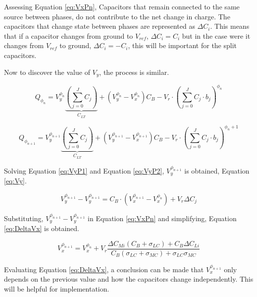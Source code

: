 Assessing Equation \ref{eq:VxPn}, Capacitors that remain connected to the same source between phases, do not contribute to the net change in charge. The capacitors that change state between phases are represented as $\Delta C_i$. This means that if a capacitor changes from ground to $V_{ref}$, $\Delta C_i = C_i$ but in the case were it changes from $V_{ref}$ to ground,  $\Delta C_i = -C_i$, this will be important for the split capacitors.

Now to discover the value of $V_y$, the process is similar. 

\begin{equation}
    Q_{\phi_{n}} = V_y^{\phi_n}\underbrace{\left( \sum_{j=0}^{J}C_j \right)}_{C_{LT}} + (V_y^{\phi_{n}}-V_x^{\phi_{n}})C_B-V_r\cdot \left ( \sum_{j=0}^{J} C_j\cdot b_j \right )^{\phi_n}
    \label{eq:VyP1}
\end{equation}

\begin{equation}
    Q_{\phi_{n+1}} = V_y^{\phi_{n+1}}\underbrace{\left( \sum_{j=0}^{J}C_j \right)}_{C_{LT}} + (V_y^{\phi_{n+1}}-V_x^{\phi_{n+1}})C_B-V_r\cdot \left ( \sum_{j=0}^{J} C_j\cdot b_j \right )^{\phi_n+1}
    \label{eq:VyP2}
\end{equation}

Solving Equation \ref{eq:VyP1} and Equation \ref{eq:VyP2}, $V_{y}^{\phi_{n+1}}$ is obtained, Equation \ref{eq:Vy}.

\begin{equation}
    V_y^{\phi_{n+1}}-V_y^{\phi_{n+1}} = C_B\cdot (V_x^{\phi_{n+1}}-V_x^{\phi_n}) + V_r\Delta C_j
    \label{eq:Vy}
\end{equation}

Substituting, $V_y^{\phi_{n+1}}-V_y^{\phi_{n+1}}$ in Equation \ref{eq:VxPn} and simplifying, Equation \ref{eq:DeltaVx} is obtained.

\begin{equation}
    \boxed{V_{x}^{\phi_{n+1}}=V_{x}^{\phi_n}+V_{r}\frac{   {\Delta}C_{Mi} (C_{B} + \sigma_{LC} )+C_{B} {\Delta}C_{Li}}{C_{B}\left( \sigma_{LC} + \sigma_{MC}\right) + \sigma_{LC} \sigma_{MC}}}
    \label{eq:DeltaVx}
\end{equation}

Evaluating Equation \ref{eq:DeltaVx}, a conclusion can be made that $V_x^{\phi_{n+1}}$ only depends on the previous value and how the capacitors change independently. This will be helpful for implementation. 